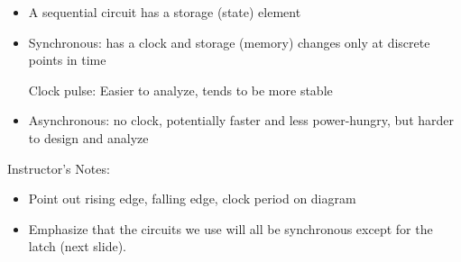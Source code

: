 
\begin{frame}[fragile]
\begin{itemize}
\item A sequential circuit has a storage (state) element 
	\item Synchronous: has a clock and storage (memory) changes only at discrete points in time
  
		Clock pulse:
  	Easier to analyze, tends to be more stable
	\item Asynchronous: no clock, potentially faster and less power-hungry, but harder to design and analyze

\end{itemize}
\end{frame}

\BNotes\ifnum{}
\begin{frame}[fragile]
Instructor's Notes:
\begin{itemize}
\item Point out rising edge, falling edge, clock period on diagram
\item Emphasize that the circuits we use will all be synchronous
	except for the latch (next slide).
\end{itemize}
\end{frame}
\fi\ENotes

